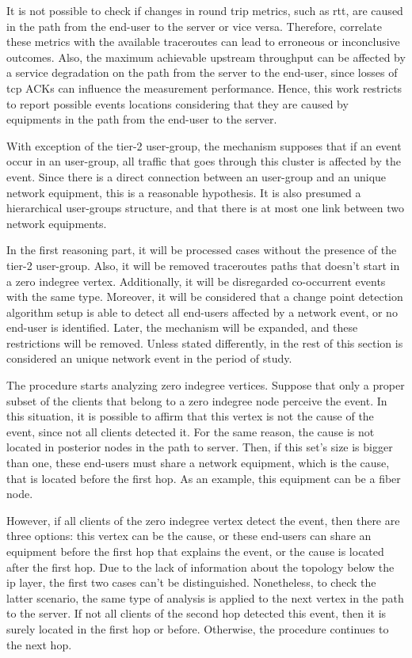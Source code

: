 It is not possible to check if changes in round trip metrics, such as \gls*{rtt},
are caused in the path from the end-user to the server or vice versa.
Therefore, correlate these metrics with the available traceroutes can lead to
erroneous or inconclusive outcomes. Also, the maximum achievable upstream
throughput can be affected by a service degradation on the path from the server
to the end-user, since losses of \gls*{tcp} ACKs can influence the measurement
performance.
Hence, this work restricts to report possible events locations considering that
they are caused by equipments in the path from the end-user to the server.

With exception of the tier-2 user-group, the mechanism supposes that
if an event occur in an user-group,
all traffic that goes through this cluster is affected by the event. Since
there is a direct connection between an user-group and an unique network
equipment, this is a reasonable hypothesis.
It is also presumed a hierarchical user-groups structure, and that there is at most
one link between two network equipments.

In the first reasoning part, it will be processed cases without the
presence of the tier-2 user-group.
Also, it will be removed
traceroutes paths that doesn't start in a zero indegree vertex.
Additionally, it will be disregarded co-occurrent events with the same type.
Moreover, it will be considered that
a change point detection algorithm setup is able to detect all end-users
affected by a network event, or no end-user is identified.
Later, the mechanism will be expanded, and these restrictions will be removed.
Unless stated differently, in the rest of this section is considered an
unique network event in the period of study.

The procedure starts analyzing zero indegree vertices.
Suppose that only a proper subset of the clients that belong to a zero
indegree node perceive the event. In this situation, it is possible to affirm
that this vertex is not the cause of the event, since not all clients detected
it. For the same reason, the cause is not located in posterior nodes
in the path to server.
Then, if this set's size is bigger than one, these end-users must share
a network equipment, which is the cause, that is located before the first hop.
As an example, this equipment can be a fiber node.

However, if all clients of the zero indegree vertex detect the event, then
there are three options:
this vertex can be the cause, or these end-users can share an equipment before
the first hop that explains the event,
or the cause is located after the first hop. Due to the
lack of information about the topology below the \gls*{ip} layer, the first two cases
can't be
distinguished. Nonetheless, to check the latter scenario, the same type of
analysis is applied to the next vertex in the path to the server. If not all
clients of the second hop detected this event, then it is surely located
in the first hop or before. Otherwise, the procedure continues to the next hop.

